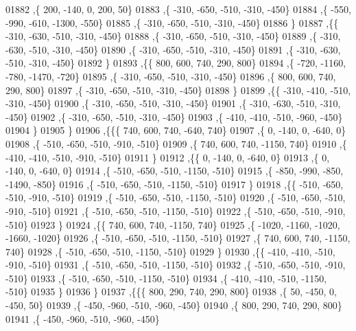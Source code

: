 \begin{DoxyCode}
01882     ,\{   200,  -140,     0,   200,    50\}
01883     ,\{  -310,  -650,  -510,  -310,  -450\}
01884     ,\{  -550,  -990,  -610, -1300,  -550\}
01885     ,\{  -310,  -650,  -510,  -310,  -450\}
01886     \}
01887    ,\{\{  -310,  -630,  -510,  -310,  -450\}
01888     ,\{  -310,  -650,  -510,  -310,  -450\}
01889     ,\{  -310,  -630,  -510,  -310,  -450\}
01890     ,\{  -310,  -650,  -510,  -310,  -450\}
01891     ,\{  -310,  -630,  -510,  -310,  -450\}
01892     \}
01893    ,\{\{   800,   600,   740,   290,   800\}
01894     ,\{  -720, -1160,  -780, -1470,  -720\}
01895     ,\{  -310,  -650,  -510,  -310,  -450\}
01896     ,\{   800,   600,   740,   290,   800\}
01897     ,\{  -310,  -650,  -510,  -310,  -450\}
01898     \}
01899    ,\{\{  -310,  -410,  -510,  -310,  -450\}
01900     ,\{  -310,  -650,  -510,  -310,  -450\}
01901     ,\{  -310,  -630,  -510,  -310,  -450\}
01902     ,\{  -310,  -650,  -510,  -310,  -450\}
01903     ,\{  -410,  -410,  -510,  -960,  -450\}
01904     \}
01905    \}
01906   ,\{\{\{   740,   600,   740,  -640,   740\}
01907     ,\{     0,  -140,     0,  -640,     0\}
01908     ,\{  -510,  -650,  -510,  -910,  -510\}
01909     ,\{   740,   600,   740, -1150,   740\}
01910     ,\{  -410,  -410,  -510,  -910,  -510\}
01911     \}
01912    ,\{\{     0,  -140,     0,  -640,     0\}
01913     ,\{     0,  -140,     0,  -640,     0\}
01914     ,\{  -510,  -650,  -510, -1150,  -510\}
01915     ,\{  -850,  -990,  -850, -1490,  -850\}
01916     ,\{  -510,  -650,  -510, -1150,  -510\}
01917     \}
01918    ,\{\{  -510,  -650,  -510,  -910,  -510\}
01919     ,\{  -510,  -650,  -510, -1150,  -510\}
01920     ,\{  -510,  -650,  -510,  -910,  -510\}
01921     ,\{  -510,  -650,  -510, -1150,  -510\}
01922     ,\{  -510,  -650,  -510,  -910,  -510\}
01923     \}
01924    ,\{\{   740,   600,   740, -1150,   740\}
01925     ,\{ -1020, -1160, -1020, -1660, -1020\}
01926     ,\{  -510,  -650,  -510, -1150,  -510\}
01927     ,\{   740,   600,   740, -1150,   740\}
01928     ,\{  -510,  -650,  -510, -1150,  -510\}
01929     \}
01930    ,\{\{  -410,  -410,  -510,  -910,  -510\}
01931     ,\{  -510,  -650,  -510, -1150,  -510\}
01932     ,\{  -510,  -650,  -510,  -910,  -510\}
01933     ,\{  -510,  -650,  -510, -1150,  -510\}
01934     ,\{  -410,  -410,  -510, -1150,  -510\}
01935     \}
01936    \}
01937   ,\{\{\{   800,   290,   740,   290,   800\}
01938     ,\{    50,  -450,     0,  -450,    50\}
01939     ,\{  -450,  -960,  -510,  -960,  -450\}
01940     ,\{   800,   290,   740,   290,   800\}
01941     ,\{  -450,  -960,  -510,  -960,  -450\}

\end{DoxyCode}
